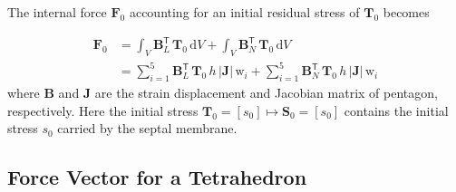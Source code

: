 The internal force $\boldsymbol{F}_0$ accounting for an initial residual stress of $\boldsymbol{T}_0$ becomes

\begin{equation}
	\begin{aligned}
		\boldsymbol{F}_0 &= \int_V \mathbf{B}_L^{\mathsf{T}} \,	\boldsymbol{T}_0 \, 
		\mathrm{d}V + 	\int_V \mathbf{B}_N^{\mathsf{T}} \,	\boldsymbol{T}_0 \, \mathrm{d}V \\
		& =  \sum_{i=1}^{5} \mathbf{B}_L^{\mathsf{T}} \,	\boldsymbol{T}_0 \, h \, | \mathbf{J} | \, \mathrm{w}_i +  \sum_{i=1}^{5} \mathbf{B}_N^{\mathsf{T}} \,	\boldsymbol{T}_0 \, h \, | \mathbf{J} | \, \mathrm{w}_i
	\end{aligned}
\end{equation}
where $\mathbf{B}$ and $\mathbf{J}$ are the strain displacement and Jacobian matrix of pentagon, respectively. Here the initial stress $\mathbf{T}_0 = [s_0] \mapsto \mathbf{S}_0 = [s_0]$  contains the initial stress $s_0$ carried by the septal membrane.

\subsection{Force Vector for a Tetrahedron}

